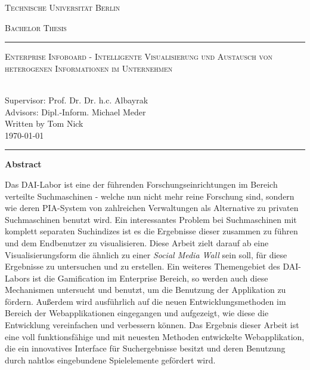 \documentclass[12pt,twoside]{book}
\renewcommand{\title}{Enterprise Infoboard - Intelligente Visualisierung und Austausch von heterogenen Informationen im Unternehmen}
\renewcommand{\author}{Tom Nick}
\begin{document}
\begin{titlepage}
\begin{center}
{\Huge \textsc{Technische Universität Berlin}}
{\fontsize{2.5cm}{2cm}\selectfont \textsc{Bachelor Thesis}\par}
\vspace{1cm}
\hrule
\vspace{0.3cm}
{\Huge \textsc{\title{}}\par}
~\\[0.1cm]
{\Large Supervisor: Prof. Dr. Dr. h.c. Albayrak}\\[0.1cm]
{\Large Advisors: Dipl.-Inform. Michael Meder}\\[0.3cm]
{\Large Written by \author{}}\\[0.1cm]
{\Large \today}
\vspace{0.55cm}
\hrule
\end{center}
\vfill
\begin{center}{\Large\textbf{Abstract}}\end{center}

Das DAI-Labor ist eine der führenden Forschungseinrichtungen im Bereich verteilte Suchmaschinen - welche nun nicht mehr reine Forschung sind, sondern wie deren PIA-System von zahlreichen Verwaltungen als Alternative zu privaten Suchmaschinen benutzt wird. Ein interessantes Problem bei Suchmaschinen mit komplett separaten Suchindizes ist es die Ergebnisse dieser zusammen zu führen und dem Endbenutzer zu visualisieren. Diese Arbeit zielt darauf ab eine Visualisierungsform die ähnlich zu einer \textit{Social Media Wall} sein soll, für diese Ergebnisse zu untersuchen und zu erstellen.
Ein weiteres Themengebiet des DAI-Labors ist die Gamification im Enterprise Bereich, so werden auch diese Mechanismen untersucht und benutzt, um die Benutzung der Applikation zu fördern.
Außerdem wird ausführlich auf die neuen Entwicklungsmethoden im Bereich der Webapplikationen eingegangen und aufgezeigt, wie diese die Entwicklung vereinfachen und verbessern können.
Das Ergebnis dieser Arbeit ist eine voll funktionsfähige und mit neuesten Methoden entwickelte Webapplikation, die ein innovatives Interface für Suchergebnisse besitzt und deren Benutzung durch nahtlos eingebundene Spielelemente gefördert wird.

\end{titlepage}
\end{document}
